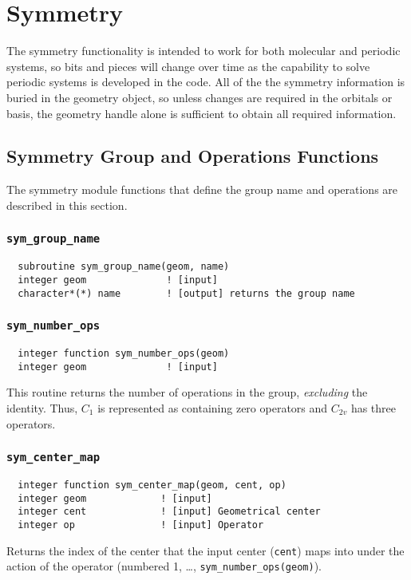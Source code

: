 \section{Symmetry}
\label{sec:sym}

The symmetry functionality is intended to work for both molecular and
periodic systems, so bits and pieces will change over time as the
capability to solve periodic systems is developed in the code.
All of the the symmetry information is buried in the geometry
object, so unless changes are required in the orbitals or basis, the
geometry handle alone is sufficient to obtain all required information.

\subsection{Symmetry Group and Operations Functions}

The symmetry module functions that define the group name and operations
are described in this section.

\subsubsection{{\tt sym\_group\_name}}
\begin{verbatim}
  subroutine sym_group_name(geom, name)
  integer geom              ! [input]
  character*(*) name        ! [output] returns the group name
\end{verbatim}

\subsubsection{{\tt sym\_number\_ops}}
\begin{verbatim}
  integer function sym_number_ops(geom)
  integer geom              ! [input]
\end{verbatim}
This routine  returns the number of operations in the group, {\em excluding} the
identity.  Thus, $C_1$ is represented as containing zero operators and
$C_{2v}$ has three operators.

\subsubsection{{\tt sym\_center\_map}}
\begin{verbatim}
  integer function sym_center_map(geom, cent, op)
  integer geom             ! [input]
  integer cent             ! [input] Geometrical center
  integer op               ! [input] Operator
\end{verbatim}
Returns the index of the center that the input center
(\verb+cent+) maps into under the action of the operator
(numbered 1, \ldots, \verb+sym_number_ops(geom)+).

